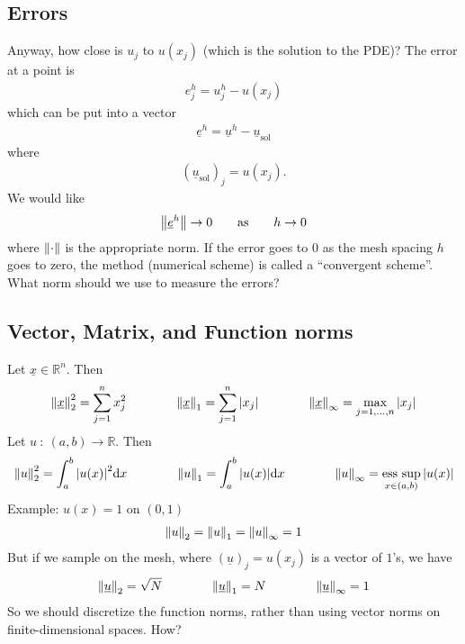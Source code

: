 \documentclass{article}
\newcommand{\Rl}{\mathbb{R}}
\newcommand{\f}[3]{#1\ :\ #2 \rightarrow #3}
\DeclareMathOperator*{\esssup}{\text{ess~sup}}
\begin{document}
        \subsection{Errors}
            Anyway, how close is $u_j$ to $u(x_j)$ (which is the solution to the PDE)?  The error at a point is
            \begin{align*}
                e_j^h = u_j^h - u(x_j)
            \end{align*}
            which can be put into a vector
            \begin{align*}
                \underline{e}^h = \underline{u}^h - \underline{u}_\text{sol}
            \end{align*}
            where
            \begin{align*}
                (\underline{u}_\text{sol})_j = u(x_j).
            \end{align*}
            We would like
            \begin{align*}
                \norm{\underline{e}^h} \rightarrow 0 \qquad \text{as} \qquad h \rightarrow 0
            \end{align*}
            where $\norm{\cdot}$ is the appropriate norm.  If the error goes to $0$ as the mesh spacing $h$ goes to zero, the method (numerical scheme) is called a ``convergent scheme''.  What norm should we use to measure the errors?
        \subsection{Vector, Matrix, and Function norms}
            Let $\underline{x} \in \Rl^n$.  Then
            \begin{align*}
                \norm{\underline{x}}_2^2 = \sum_{j=1}^n x_j^2 \qquad \qquad \norm{\underline{x}}_1 = \sum_{j=1}^n \abs{x_j} \qquad \qquad \norm{\underline{x}}_\infty = \max_{j=1,\dots,n}\abs{x_j}
            \end{align*}
            Let $\f{u}{(a,b)}{\Rl}$.  Then
            \begin{align*}
                \norm{u}_2^2 = \int_a^b \abs{u(x)}^2\dd x \qquad \qquad \norm{u}_1 = \int_a^b \abs{u(x)}\dd x \qquad \qquad \norm{u}_\infty = \esssup_{x\in(a,b)}\abs{u(x)}
            \end{align*}
            Example: $u(x) = 1$ on $(0,1)$
            \begin{align*}
                \norm{u}_2 = \norm{u}_1 = \norm{u}_\infty = 1
            \end{align*}
            But if we sample on the mesh, where $(\underline{u})_j = u(x_j)$ is a vector of $1$'s, we have
            \begin{align*}
                \norm{\underline{u}}_2 = \sqrt{N} \qquad \qquad \norm{\underline{u}}_1 = N \qquad \qquad \norm{\underline{u}}_\infty = 1
            \end{align*}
            So we should discretize the function norms, rather than using vector norms on finite-dimensional spaces.  How?
\end{document}
